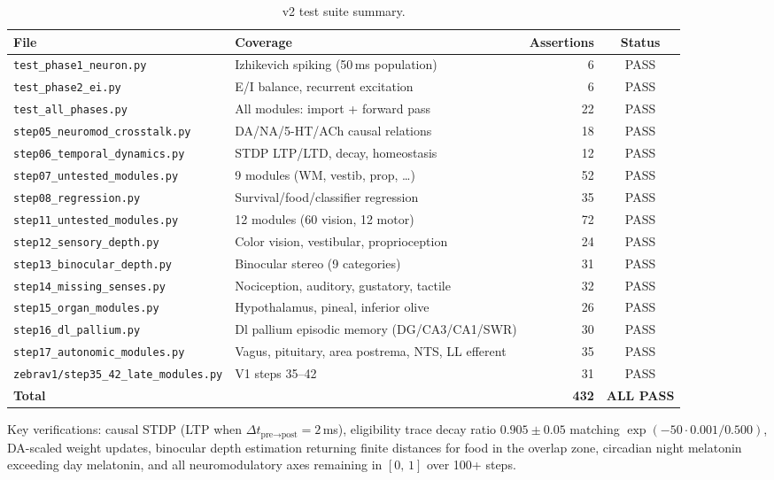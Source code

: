\documentclass[11pt,a4paper]{article}
\begin{document}
\begin{table}[H]
\centering
\caption{v2 test suite summary.}
\label{tab:test_suite}
\small
\begin{tabular}{llrc}
\toprule
File & Coverage & Assertions & Status \\
\midrule
\texttt{test\_phase1\_neuron.py} & Izhikevich spiking (50\,ms population) & 6 & PASS \\
\texttt{test\_phase2\_ei.py}     & E/I balance, recurrent excitation & 6 & PASS \\
\texttt{test\_all\_phases.py}    & All modules: import + forward pass & 22 & PASS \\
\texttt{step05\_neuromod\_crosstalk.py} & DA/NA/5-HT/ACh causal relations & 18 & PASS \\
\texttt{step06\_temporal\_dynamics.py} & STDP LTP/LTD, decay, homeostasis & 12 & PASS \\
\texttt{step07\_untested\_modules.py}  & 9 modules (WM, vestib, prop, \ldots) & 52 & PASS \\
\texttt{step08\_regression.py}         & Survival/food/classifier regression & 35 & PASS \\
\texttt{step11\_untested\_modules.py}  & 12 modules (60 vision, 12 motor) & 72 & PASS \\
\texttt{step12\_sensory\_depth.py}     & Color vision, vestibular, proprioception & 24 & PASS \\
\texttt{step13\_binocular\_depth.py}   & Binocular stereo (9 categories) & 31 & PASS \\
\texttt{step14\_missing\_senses.py}    & Nociception, auditory, gustatory, tactile & 32 & PASS \\
\texttt{step15\_organ\_modules.py}    & Hypothalamus, pineal, inferior olive & 26 & PASS \\
\texttt{step16\_dl\_pallium.py}      & Dl pallium episodic memory (DG/CA3/CA1/SWR) & 30 & PASS \\
\texttt{step17\_autonomic\_modules.py} & Vagus, pituitary, area postrema, NTS, LL efferent & 35 & PASS \\
\texttt{zebrav1/step35\_42\_late\_modules.py} & V1 steps 35--42 & 31 & PASS \\
\midrule
\textbf{Total} & & \textbf{432} & \textbf{ALL PASS} \\
\bottomrule
\end{tabular}
\end{table}

\noindent Key verifications: causal STDP (LTP when $\Delta t_{\text{pre}\to\text{post}} = 2$\,ms),
eligibility trace decay ratio $0.905 \pm 0.05$ matching $\exp(-50 \cdot 0.001/0.500)$,
DA-scaled weight updates, binocular depth estimation returning finite distances for
food in the overlap zone, circadian night melatonin exceeding day melatonin,
and all neuromodulatory axes remaining in $[0,\,1]$ over 100+ steps.
\end{document}
